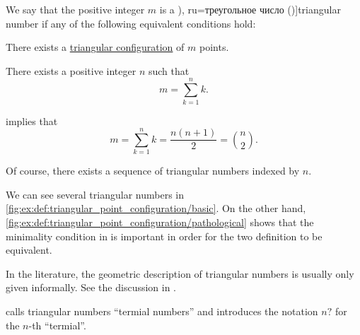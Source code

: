 \begin{definition}\label{def:triangular_number}
  We say that the positive integer \( m \) is a \term[en=triangular number (\cite[1]{Deza2012FigurateNumbers}), ru=треугольное число (\cite[14]{АлександровМаркушевичХинчинИПр1963ЭнциклопедияТом4})]{triangular number} if any of the following equivalent conditions hold:
  \begin{thmenum}
     There exists a \hyperref[def:triangular_point_configuration]{triangular configuration} of \( m \) points.

     There exists a positive integer \( n \) such that
    \begin{equation}\label{eq:def:triangular_number/arithmetic}
      m = \sum_{k=1}^n k.
    \end{equation}
  \end{thmenum}
\end{definition}
\begin{comments}
  \item {} implies that
  \begin{equation*}
    m = \sum_{k=1}^n k = \frac {n(n + 1)} 2 = \binom n 2.
  \end{equation*}

  \item Of course, there exists a sequence of triangular numbers indexed by \( n \).

  \item We can see several triangular numbers in \cref{fig:ex:def:triangular_point_configuration/basic}. On the other hand, \cref{fig:ex:def:triangular_point_configuration/pathological} shows that the minimality condition in  is important in order for the two definition to be equivalent.

  \item In the literature, the geometric description of triangular numbers is usually only given informally. See the discussion in .

  \item {} calls triangular numbers \enquote{termial numbers} and introduces the notation \( n? \) for the \( n \)-th \enquote{termial}.
\end{comments}
